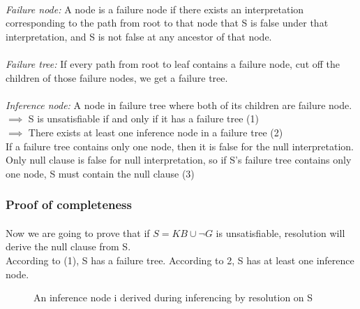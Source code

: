 \documentclass[part1.tex]{subfiles}
\begin{document}
\paragraph{}{\em Failure node:} A node is a failure node if there exists an interpretation corresponding to
the path from root to that node that S is false under that interpretation, and S is not false at 
any ancestor of that node.\\
\paragraph{}{\em Failure tree:} If every path from root to leaf contains a failure node, cut off the children
of those failure nodes, we get a failure tree.\\
\paragraph{}{\em Inference node:} A node in failure tree where both of its children are failure node.\\
\(\implies\) S is unsatisfiable if and only if it has a failure tree (1)\\
\(\implies\) There exists at least one inference node in a failure tree (2)\\
If a failure tree contains only one node, then it is false for the null interpretation.
Only null clause is false for null interpretation, so if S's failure tree contains only one node, S
must contain the null clause (3)\\
%
\subsubsection{Proof of completeness}
\paragraph{} Now we are going to prove that if \(S = KB \cup \neg G\) is 
unsatisfiable, resolution will derive the null clause from S. \\
According to (1), S has a failure tree. According to 2, S has at least one inference node.\\
\begin{figure}[H]
\caption{An inference node i derived during inferencing by
resolution on S}
\end{figure}
\end{document}
